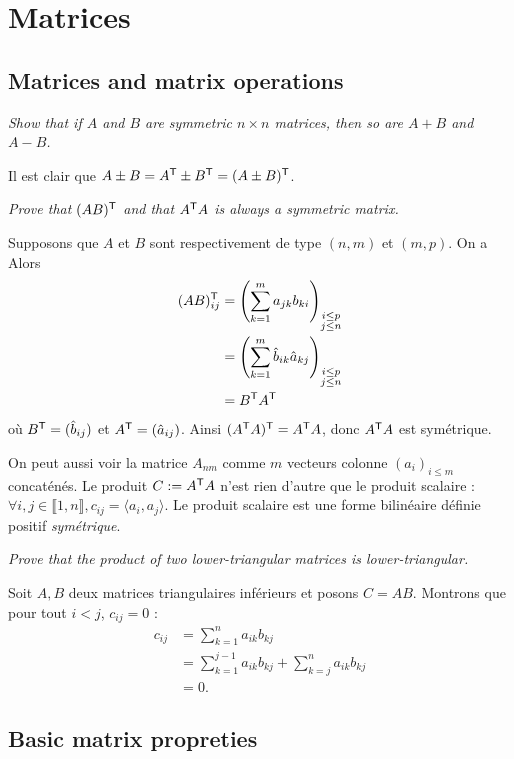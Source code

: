 \section{Matrices}

\subsection{Matrices and matrix operations}

\begin{description}
   \textit{Show that if $A$ and $B$ are symmetric $n \times n$ matrices, then so are $A + B$ and $A - B$.}
    \begin{ex}
        Il est clair que $A \pm B = A^{\mathsf{T}} \pm B^{\mathsf{T}} = (A \pm B)^{\mathsf{T}}$.
    \end{ex}
   \textit{Prove that $(AB)^{\mathsf{T}}$ and that $A^{\mathsf{T}} A$ is always a symmetric matrix.}
    \begin{ex}
    Supposons que $A$ et $B$ sont respectivement de type $(n, m)$ et $(m,p)$. On a Alors
        \begin{align*}
          (AB)^{\mathsf{T}}_{ij} &= \left( \sum_{k=1}^m a_{jk}b_{ki} \right)_{\substack{i\le p\\j\le n}}\\
          &=\left( \sum_{k=1}^m \hat{b}_{ik}\hat{a}_{kj} \right)_{\substack{i\le p\\j\le n}}\\
          &= B^{\mathsf{T}} A^{\mathsf{T}}
        \end{align*}
    où $B^{\mathsf{T}} = (\hat{b}_{ij})$ et $A^{\mathsf{T}} = (\hat{a}_{ij})$. Ainsi $(A^{\mathsf{T}} A)^{\mathsf{T}} = A^{\mathsf{T}} A$, donc $A^{\mathsf{T}} A$ est symétrique.

    On peut aussi voir la matrice $A_{nm}$ comme $m$ vecteurs colonne $(a_i)_{i\le m}$ concaténés. Le produit $C := A^{\mathsf{T}} A$ n'est rien d'autre que le produit scalaire : $\forall i, j \in \llbracket 1, n \rrbracket, c_{ij} = \langle a_i, a_j \rangle$. Le produit scalaire est une forme bilinéaire définie positif \textit{symétrique}.
    \end{ex}
   \textit{Prove that the product of two lower-triangular matrices is lower-triangular.}
  \begin{ex}
    Soit $A, B$ deux matrices triangulaires inférieurs et posons $C = AB$. Montrons que pour tout $i < j$, $c_{ij} = 0$ :
        \begin{align*}
          c_{ij} &= \sum_{k=1}^n a_{ik}b_{kj}\\
          &= \sum_{k=1}^{j-1} a_{ik}b_{kj} + \sum_{k=j}^{n} a_{ik}b_{kj}\\
          &= 0.
        \end{align*}
  \end{ex}
   \textit{}
\end{description}

\subsection{Basic matrix propreties}
